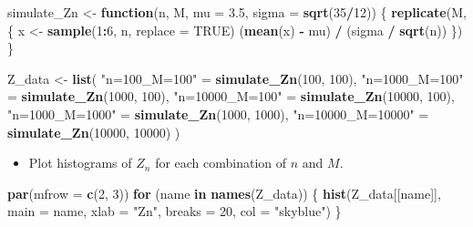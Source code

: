 \documentclass[
]{article}
\newenvironment{Shaded}{\begin{snugshade}}{\end{snugshade}}
\newcommand{\AttributeTok}[1]{\textcolor[rgb]{0.13,0.29,0.53}{#1}}
\newcommand{\ConstantTok}[1]{\textcolor[rgb]{0.56,0.35,0.01}{#1}}
\newcommand{\ControlFlowTok}[1]{\textcolor[rgb]{0.13,0.29,0.53}{\textbf{#1}}}
\newcommand{\DecValTok}[1]{\textcolor[rgb]{0.00,0.00,0.81}{#1}}
\newcommand{\FloatTok}[1]{\textcolor[rgb]{0.00,0.00,0.81}{#1}}
\newcommand{\FunctionTok}[1]{\textcolor[rgb]{0.13,0.29,0.53}{\textbf{#1}}}
\newcommand{\NormalTok}[1]{#1}
\newcommand{\OtherTok}[1]{\textcolor[rgb]{0.56,0.35,0.01}{#1}}
\newcommand{\SpecialCharTok}[1]{\textcolor[rgb]{0.81,0.36,0.00}{\textbf{#1}}}
\newcommand{\StringTok}[1]{\textcolor[rgb]{0.31,0.60,0.02}{#1}}
\providecommand{\tightlist}{%
  \setlength{\itemsep}{0pt}\setlength{\parskip}{0pt}}
\begin{document}
\begin{Shaded}
\begin{Highlighting}[]
\NormalTok{simulate\_Zn }\OtherTok{\textless{}{-}} \ControlFlowTok{function}\NormalTok{(n, M, }\AttributeTok{mu =} \FloatTok{3.5}\NormalTok{, }\AttributeTok{sigma =} \FunctionTok{sqrt}\NormalTok{(}\DecValTok{35}\SpecialCharTok{/}\DecValTok{12}\NormalTok{)) \{}
  \FunctionTok{replicate}\NormalTok{(M, \{}
\NormalTok{    x }\OtherTok{\textless{}{-}} \FunctionTok{sample}\NormalTok{(}\DecValTok{1}\SpecialCharTok{:}\DecValTok{6}\NormalTok{, n, }\AttributeTok{replace =} \ConstantTok{TRUE}\NormalTok{)}
\NormalTok{    (}\FunctionTok{mean}\NormalTok{(x) }\SpecialCharTok{{-}}\NormalTok{ mu) }\SpecialCharTok{/}\NormalTok{ (sigma }\SpecialCharTok{/} \FunctionTok{sqrt}\NormalTok{(n))}
\NormalTok{  \})}
\NormalTok{\}}

\NormalTok{Z\_data }\OtherTok{\textless{}{-}} \FunctionTok{list}\NormalTok{(}
  \StringTok{"n=100\_M=100"} \OtherTok{=} \FunctionTok{simulate\_Zn}\NormalTok{(}\DecValTok{100}\NormalTok{, }\DecValTok{100}\NormalTok{),}
  \StringTok{"n=1000\_M=100"} \OtherTok{=} \FunctionTok{simulate\_Zn}\NormalTok{(}\DecValTok{1000}\NormalTok{, }\DecValTok{100}\NormalTok{),}
  \StringTok{"n=10000\_M=100"} \OtherTok{=} \FunctionTok{simulate\_Zn}\NormalTok{(}\DecValTok{10000}\NormalTok{, }\DecValTok{100}\NormalTok{),}
  \StringTok{"n=1000\_M=1000"} \OtherTok{=} \FunctionTok{simulate\_Zn}\NormalTok{(}\DecValTok{1000}\NormalTok{, }\DecValTok{1000}\NormalTok{),}
  \StringTok{"n=10000\_M=10000"} \OtherTok{=} \FunctionTok{simulate\_Zn}\NormalTok{(}\DecValTok{10000}\NormalTok{, }\DecValTok{10000}\NormalTok{)}
\NormalTok{)}
\end{Highlighting}
\end{Shaded}

\begin{itemize}
\tightlist
\item
  Plot histograms of \(Z_n\) for each combination of \(n\) and \(M\).
\end{itemize}

\begin{Shaded}
\begin{Highlighting}[]
\FunctionTok{par}\NormalTok{(}\AttributeTok{mfrow =} \FunctionTok{c}\NormalTok{(}\DecValTok{2}\NormalTok{, }\DecValTok{3}\NormalTok{))}
\ControlFlowTok{for}\NormalTok{ (name }\ControlFlowTok{in} \FunctionTok{names}\NormalTok{(Z\_data)) \{}
  \FunctionTok{hist}\NormalTok{(Z\_data[[name]], }\AttributeTok{main =}\NormalTok{ name, }\AttributeTok{xlab =} \StringTok{"Zn"}\NormalTok{, }\AttributeTok{breaks =} \DecValTok{20}\NormalTok{, }\AttributeTok{col =} \StringTok{"skyblue"}\NormalTok{)}
\NormalTok{\}}
\end{Highlighting}
\end{Shaded}
\end{document}
